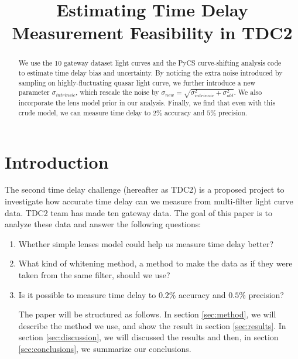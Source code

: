 \documentclass[\docopts]{\docclass}
\begin{document}
\title{ Estimating Time Delay Measurement Feasibility in TDC2 }

\maketitlepre

\begin{abstract}

We use the 10 gateway dataset light curves and the PyCS curve-shifting analysis code to estimate time delay bias and uncertainty. By noticing the extra noise introduced by sampling on highly-fluctuating quasar light curve, we further introduce a new parameter $\sigma_{intrinsic}$, which rescale the noise by $\sigma_{new}=\sqrt{\sigma_{intrinsic}^2+\sigma_{old}^2}$. We also incorporate the lens model prior in our analysis.  Finally, we find that even with this crude model, we can measure time delay to $2\%$ accuracy and $5\%$ precision. 


\end{abstract}


\maketitlepost

%

\section{Introduction}
\label{sec:intro}
The second time delay challenge (hereafter as TDC2) is a proposed project to investigate how accurate time delay can we measure from multi-filter light curve data.  TDC2 team has made ten gateway data. The goal of this paper is to analyze these data and answer the following questions:
\begin{enumerate}

\item Whether simple lenses model could help us measure time delay better?
\item What kind of whitening method, a method to make the data as if they were taken from the same filter, should we use?
\item Is it possible to measure time delay to $0.2\%$ accuracy and $0.5\%$ precision? 

The paper will be structured as follows.  In section \ref{sec:method}, we will describe the method we use, and show the result in section \ref{sec:results}. In section \ref{sec:discussion}, we will discussed the results and then, in section \ref{sec:conclusions}, we summarize our conclusions.  

\end{enumerate}
\end{document}
